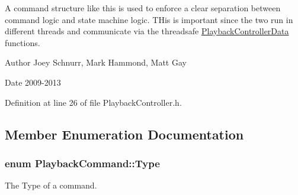 A command structure like this is used to enforce a clear separation between command logic and state machine logic. T\-His is important since the two run in different threads and communicate via the threadsafe \hyperlink{class_playback_controller_data}{Playback\-Controller\-Data} functions. \begin{DoxyAuthor}{Author}
Joey Schnurr, Mark Hammond, Matt Gay 
\end{DoxyAuthor}
\begin{DoxyDate}{Date}
2009-\/2013 
\end{DoxyDate}


Definition at line 26 of file Playback\-Controller.\-h.



\subsection{Member Enumeration Documentation}
\hypertarget{struct_playback_command_a6965fdf688457819423c37d4b7369b8e}{
\subsubsection[{Type}]{\setlength{\rightskip}{0pt plus 5cm}enum {\bf Playback\-Command\-::\-Type}}}\label{struct_playback_command_a6965fdf688457819423c37d4b7369b8e}


The Type of a command. 

